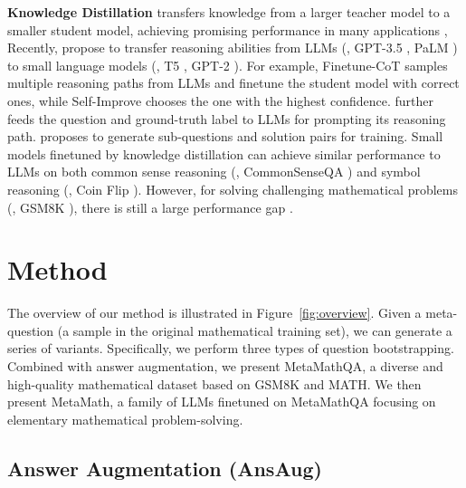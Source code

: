     \vspace{-1mm}
    \textbf{Knowledge Distillation} \citep{hinton2015distilling, gou2021knowledge} transfers knowledge from a larger teacher model to a smaller student model, achieving promising performance in many applications \citep{shen2018feature, park2019relational, he2019knowledge, mirzadeh2020improved},
    Recently, \citep{li2022explanations, huang2022large, ho2023large, magister2023teaching, hsieh2023distilling, fu23d, shridhar2023distilling} propose to 
    transfer reasoning abilities 
    from LLMs (\eg, GPT-3.5 \citep{gpt3-5}, PaLM \citep{chowdhery2022palm}) to small language models (\eg, T5 \citep{Colin2020t5}, GPT-2 \citep{gpt2}). For example,
    Finetune-CoT \citep{ho2023large} samples multiple reasoning paths from LLMs and  finetune the student model with correct ones,
    while Self-Improve \citep{huang2022large} chooses the one with the highest confidence.
    \citet{li2022explanations} further feeds the question and ground-truth label to LLMs
    for prompting its reasoning path.
    \citet{shridhar2023distilling} proposes to generate sub-questions and solution pairs for training. Small models finetuned by knowledge distillation can achieve similar performance to LLMs \citep{magister2023teaching, ho2023large} on both common sense reasoning (\eg, CommonSenseQA \citep{talmor2019commonsenseqa}) and symbol reasoning (\eg, Coin Flip \citep{wei2022chain}). However, for solving challenging mathematical problems (\eg, GSM8K \citep{cobbe2021training}), there is still a large performance gap  \citep{ho2023large, fu23d, magister2023teaching}.

    \vspace{-2mm}
    \section{Method}	\label{sec:method}
    
\vspace{-2mm}
The overview of our method is illustrated in Figure~\ref{fig:overview}. Given a meta-question (a sample in the original mathematical training set), we can generate a series of variants. Specifically, we perform three types of question bootstrapping. Combined with answer augmentation, we present {MetaMathQA}, a diverse and high-quality mathematical dataset based on GSM8K and MATH. We then present {MetaMath}, a family of LLMs finetuned on MetaMathQA focusing on elementary mathematical problem-solving. 

\subsection{Answer Augmentation (AnsAug)}
\vspace{-1mm}

